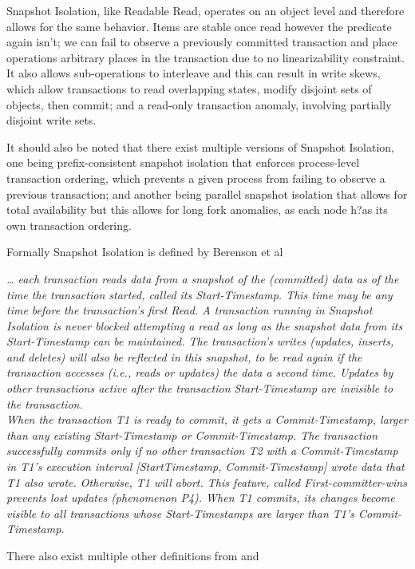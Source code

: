 \documentclass[a4paper,10pt,titlepage]{report}
\begin{document}
    Snapshot Isolation, like Readable Read, operates on an object level and therefore allows for the same behavior. Items are stable once read however the predicate again isn't; we can fail to observe a previously committed transaction and place operations arbitrary places in the transaction due to no linearizability constraint. It also allows sub-operations to interleave and this can result in write skews, which allow transactions to read overlapping states, modify disjoint sets of objects, then commit; and a read-only transaction anomaly, involving partially disjoint write sets.


    It should also be noted that there exist multiple versions of Snapshot Isolation, one being prefix-consistent snapshot isolation that enforces process-level transaction ordering, which prevents a given process from failing to observe a previous transaction; and another being parallel snapshot isolation that allows for total availability but this allows for long fork anomalies, as each node h?as its own transaction ordering.

    Formally Snapshot Isolation is defined by Berenson et al\cite{Berensonetal}

    \textit{… each transaction reads data from a snapshot of the (committed) data as of the time the transaction started, called its Start-Timestamp. This time may be any time before the transaction's first Read. A transaction running in Snapshot Isolation is never blocked attempting a read as long as the snapshot data from its Start-Timestamp can be maintained. The transaction's writes (updates, inserts, and deletes) will also be reflected in this snapshot, to be read again if the transaction accesses (i.e., reads or updates) the data a second time. Updates by other transactions active after the transaction Start-Timestamp are invisible to the transaction.
    \\
    When the transaction T1 is ready to commit, it gets a Commit-Timestamp, larger than any existing Start-Timestamp or Commit-Timestamp. The transaction successfully commits only if no other transaction T2 with a Commit-Timestamp in T1's execution interval [StartTimestamp, Commit-Timestamp] wrote data that T1 also wrote. Otherwise, T1 will abort. This feature, called First-committer-wins prevents lost updates (phenomenon P4). When T1 commits, its changes become visible to all transactions whose Start-Timestamps are larger than T1's Commit-Timestamp.}

    There also exist multiple other definitions from \cite{CeroneBernardiGotsman} and \cite{CrooksPuAlvisiClement}
\end{document}
